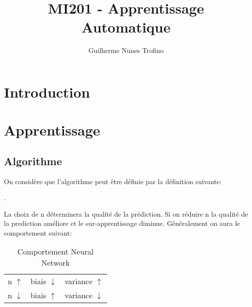 \documentclass{article}
\title{MI201 - Apprentissage Automatique}
\author{Guilherme Nunes Trofino}
\begin{document}
\maketitle
\setlength{\parindent}{0pt}

\newpage\tableofcontents

\section{Introduction}

% 
% 

\section{Apprentissage}
\subsection{Algorithme}
On considère que l'algorithme peut être définie par la définition suivante:
\begin{definition}
    .
\end{definition}

La choix de n déterminera la qualité de la prédiction. Si on réduire n la qualité de la prediction améliore et le sur-apprentissage diminue. Généralement on aura le comportement suivant:
\begin{table}[H]
    \centering\begin{tabular}{lll}
        n $\uparrow$   & biais $\downarrow$ & variance $\uparrow$\\
        n $\downarrow$ & biais $\uparrow  $ & variance $\downarrow$\\
    \end{tabular}
    \caption{Comportement Neural Network}
\end{table}
\end{document}
